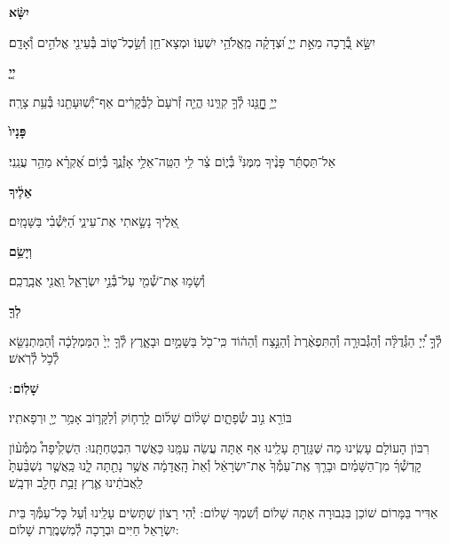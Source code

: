 \documentclass[twoside, openany, parskip=half, 11pt]{book}
\begin{document}
\textbf{יִשָּׂ֨א}
\hfill \begin{footnotesize}
יִשָּׂ֣א בְ֭֯רָכָה מֵאֵ֣ת יְיָ֑ וּ֝צְדָקָ֗ה מֵֽאֱלֹהֵ֥י יִשְׁעֽוֹ׃ וּמְצָא־חֵ֖ן וְ֯שֵׂ֣כֶל־ט֑וֹב בְּ֯עֵינֵ֖י אֱלֹהִ֣ים וְ֯אָדָֽם׃\\
\end{footnotesize}
\textbf{יְיָ֤}
\hfill \begin{footnotesize}
יְיָ֥ חׇׇׇׇׇׇנֵּ֖נוּ לְ֯ךָ֣ קִוִּ֑ינוּ הֱיֵ֤ה זְ֯רֹעָם֙ לַבְּ֯קָרִ֔ים אַף־יְ֯שֽׁוּעָתֵ֖נוּ בְּ֯עֵ֥ת צָרָֽה׃\\
\end{footnotesize}
\textbf{פָּנָיו֙}
\hfill \begin{footnotesize}
אַל־תַּסְתֵּ֬ר פָּנֶ֨יךָ מִמֶּנִּי֘ בְּ֯י֢וֹם צַ֫ר לִ֥י הַטֵּֽה־אֵלַ֥י אָזְ֯נֶ֑ךָ
בְּ֯י֥וֹם אֶ֝קְרָ֗א מַהֵ֥ר עֲנֵֽנִי׃\\
\end{footnotesize}
\textbf{אֵלֶ֔יךָ}
\hfill \begin{footnotesize}
אֵ֭לֶיךָ נָשָׂ֣אתִי אֶת־עֵינַ֑י הַ֝יֹּֽשְׁ֯בִ֗י בַּשָּׁמָֽיִם׃\\
\end{footnotesize}
\textbf{וְיָשֵׂ֥ם}
\hfill \begin{footnotesize}
וְ֯שָׂמ֥וּ אֶת־שְׁ֯מִ֖י עַל־בְּ֯נֵ֣י יִשְׂרָאֵ֑ל וַֽאֲנִ֖י אֲבָֽרֲכֵֽם׃\\
\end{footnotesize}
\textbf{לְךָ֖}
\hfill \begin{footnotesize}
לְ֯ךָ֣ יְ֠יָ הַגְּ֯דֻלָּ֨ה וְ֯הַגְּ֯בוּרָ֤ה וְ֯הַתִּפְאֶ֨רֶת֙ וְ֯הַנֵּ֣צַח וְ֯הַה֔וֹד
כִּֽי־כֹ֖ל בַּשָּׁמַ֣יִם וּבָאָ֑רֶץ לְ֯ךָ֤ יְיָ֙ הַמַּמְלָכָ֔ה וְ֯הַמִּתְנַשֵּׂ֖א
לְ֯כֹ֥ל לְ֯רֹֽאשׁ׃\\
\end{footnotesize}
\textbf{שָׁלֽוֹם}
׃ \hfill \begin{footnotesize}
בּוֹרֵ֖א נִ֣וב שְׂ֯פָתָ֑יִם שָׁל֨וֹם שָׁל֜וֹם לָֽרָח֧וֹק וְ֯לַקָּר֛וֹב
אָמַ֥ר יְיָ֖ וּרְפָאתִֽיו׃
\end{footnotesize}

\clearpage

\begin{paracol}{2}
רִבּוֹן הָעוֹלָם עָשִֽׂינוּ מַה שֶּׁגָּזַֽרְתָּ עָלֵֽינוּ אַף אַתָּה עֲשֵׂה עִמָּֽנוּ כַּאֲשֶׁר הִבְטַחְתָּֽנוּ: הַשְׁקִ֩יפָה֩ מִמְּ֯ע֨וֹן קׇדְשְׁ֯ךָ֜ מִן־הַשָּׁמַ֗יִם וּבָרֵ֤ךְ אֶֽת־עַמְּ֯ךָ֙ אֶת־יִשְׂרָאֵ֔ל וְ֯אֵת֙ הָֽאֲדָמָ֔ה אֲשֶׁ֥ר נָתַ֖תָּה לָ֑נוּ כַּֽאֲשֶׁ֤ר נִשְׁבַּ֨עְתָּ֙ לַֽאֲבֹתֵ֔ינוּ אֶ֛רֶץ זָבַ֥ת חָלָ֖ב וּדְבָֽשׁ׃

\switchcolumn

\kahal
אַדִּיר בַּמָּרוֹם שׁוֹכֵן בִּגְבוּרָה אַתָּה שָׁלוֹם וְ֯שִׁמְךָ שָׁלוֹם: יְ֯הִי רָצוֹן שֶׁתָּשִׂים עָלֵֽינוּ וְ֯עַל כׇּל־עַמְּ֯ךָ בֵּית יִשְׂרָאֵל חַיִּים וּבְרָכָה לְ֯מִשְׁמֶֽרֶת שָׁלוֹם:
\end{paracol}
\end{document}
